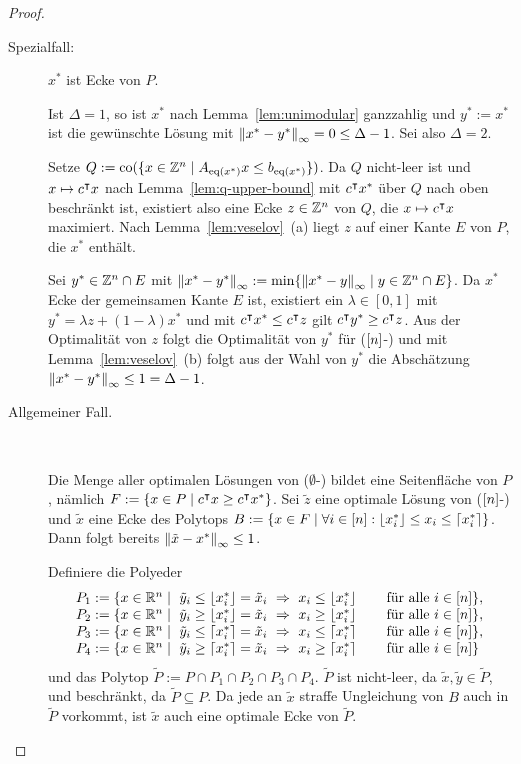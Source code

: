 \begin{proof}
	\begin{description}
		\item[Spezialfall:] $x^*$ ist Ecke von $P$.
		
		Ist $\Delta= 1$, so ist $x^*$ nach Lemma~\ref{lem:unimodular} ganzzahlig und $y^* := x^*$ ist die gewünschte Lösung mit $\left\lVert x^*-y^*\right\rVert_\infty= 0\leq \Delta-1$. Sei also $\Delta=2$.
		
		Setze $Q:=\operatorname{co}(\{x\in\mathbb{Z}^n \mid A_{\operatorname{eq}(x^*)}x \leq b_{\operatorname{eq}(x^*)} \})$.
		Da $Q$ nicht-leer ist und $x\mapsto c^\intercal x$ nach Lemma~\ref{lem:q-upper-bound} mit $c^\intercal x^*$ über $Q$ nach oben beschränkt ist, existiert also eine Ecke $z\in\mathbb{Z}^n$ von $Q$, die $x\mapsto c^\intercal x$ maximiert.
		Nach Lemma~\ref{lem:veselov}~(a) liegt $z$ auf einer Kante $E$ von $P$, die $x^*$ enthält.
		
		Sei $y^*\in\mathbb{Z}^n\cap E$ mit $\left\lVert x^* - y^*\right\rVert_\infty := \min\{ \left\lVert x^*-y\right\rVert_\infty \mid y\in\mathbb{Z}^n\cap E  \}$.
		Da $x^*$ Ecke der gemeinsamen Kante $E$ ist, existiert ein $\lambda\in [0,1]$ mit $y^* = \lambda z + (1-\lambda)x^*$ und mit $c^\intercal x^* \leq c^\intercal z$ gilt $c^\intercal y^* \geq c^\intercal z$.
		Aus der Optimalität von $z$ folgt die Optimalität von $y^*$ für ($[n]$-\MIPI) und mit Lemma~\ref{lem:veselov}~(b) folgt aus der Wahl von $y^*$ die Abschätzung $\left\lVert x^*-y^*\right\rVert_\infty\leq 1=\Delta-1$.
		
		\item[Allgemeiner Fall.] ~
		
		Die Menge aller optimalen Lösungen von ($\emptyset$-\MIPI) bildet eine Seitenfläche von $P$, nämlich $F:=\{x\in P\mid c^\intercal x \geq c^\intercal x^* \}$.
		Sei $\tilde{z}$ eine optimale Lösung von ($[n]$-\MIPI) und $\tilde{x}$ eine Ecke des Polytops $B:=\{ x\in F \mid \forall i \in [n]: \left\lfloor x^*_i \right\rfloor \leq x_i \leq \left\lceil x^*_i \right\rceil \}$.
		Dann folgt bereits $\left\lVert\tilde{x}-x^*\right\rVert_\infty\leq 1$.
		
		Definiere die Polyeder
		$$
		\begin{array}{l}
		P_1:= \{ x\in\mathbb{R}^n \mid~ \tilde{y}_i\leq \left\lfloor x^*_i \right\rfloor = \tilde{x}_i ~\Rightarrow~ x_i \leq \left\lfloor x^*_i \right\rfloor\qquad\text{für alle}~ i\in[n]\},\\
		P_2:= \{ x\in\mathbb{R}^n \mid ~ \tilde{y}_i\geq \left\lfloor x^*_i \right\rfloor = \tilde{x}_i ~\Rightarrow~ x_i \geq \left\lfloor x^*_i \right\rfloor\qquad\text{für alle}~ i\in[n]\}, \\
		P_3:= \{ x\in\mathbb{R}^n \mid ~\tilde{y}_i\leq \left\lceil x^*_i \right\rceil = \tilde{x}_i ~\Rightarrow~ x_i \leq \left\lceil x^*_i \right\rceil\qquad\text{für alle}~ i\in[n]\},\\
		P_4:= \{ x\in\mathbb{R}^n \mid ~\tilde{y}_i\geq \left\lceil x^*_i \right\rceil = \tilde{x}_i ~\Rightarrow~ x_i \geq \left\lceil x^*_i \right\rceil\qquad\text{für alle}~ i\in[n]\}
		\end{array}
		$$
		und das Polytop $\tilde{P}:=P\cap P_1 \cap P_2 \cap P_3 \cap P_4$.
		$\tilde{P}$ ist nicht-leer, da $\tilde{x}, \tilde{y}\in\tilde{P}$, und beschränkt, da $\tilde{P}\subseteq P$.
		Da jede an $\tilde{x}$ straffe Ungleichung von $B$ auch in $\tilde{P}$ vorkommt, ist $\tilde{x}$ auch eine optimale Ecke von $\tilde{P}$.
		

\end{description}
\end{proof}
